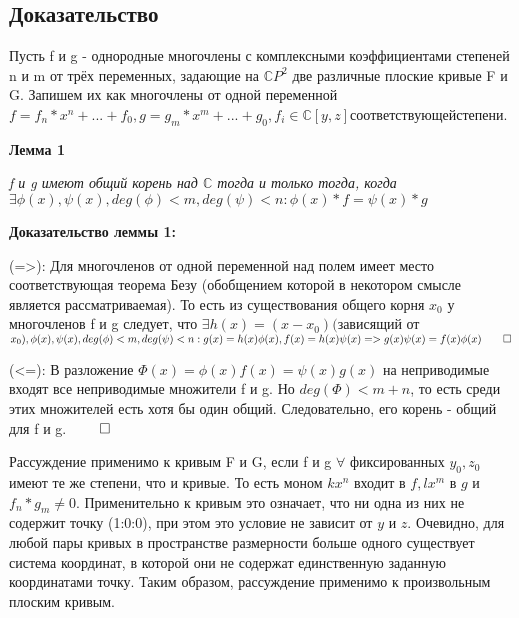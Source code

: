 \documentclass[a4paper, 12pt]{article}
\begin{document}
\subsection{Доказательство}
Пусть f и g - однородные многочлены с комплексными коэффициентами степеней n и m от трёх переменных, задающие на $\mathbb{C}P^2$ две различные плоские кривые F и G.
Запишем их как многочлены от одной переменной $f=f_n*x^n + ... + f_0, g=g_m*x^m + ... + g_0, f_i \in \mathbb{C}[y,z] соответствующей степени$.

\textbf{Лемма 1}

\textit{f и g имеют общий корень над $\mathbb{C}$ тогда и только тогда, когда $\exists \phi(x), \psi(x), deg(\phi) < m, deg(\psi) < n: \phi(x)*f = \psi(x)*g$}

\textbf{Доказательство леммы 1:}

(=>): Для многочленов от одной переменной над полем имеет место соответствующая теорема Безу (обобщением которой в некотором смысле является рассматриваемая). То есть из существования общего корня $x_0$ у многочленов f и g следует, что $\exists h(x)=(x-x_0) ($зависящий от $x_0), \phi(x), \psi(x), deg(\phi) < m, deg(\psi) < n: g(x)=h(x)\phi(x), f(x)=h(x)\psi(x) => g(x)\psi(x) = f(x)\phi(x) \qed$

(<=): В разложение $\Phi(x) = \phi(x)f(x) = \psi(x)g(x)$ на неприводимые входят все неприводимые множители f и g. Но $deg(\Phi) < m + n$, то есть среди этих множителей есть хотя бы один общий. Следовательно, его корень - общий для f и g. $\qed$

Рассуждение применимо к кривым F и G, если f и g $\forall$ фиксированных $y_0, z_0$ имеют те же степени, что и кривые. То есть моном $kx^n$ входит в $f, lx^m$ в $g$ и $f_n*g_m \neq 0$. Применительно к кривым это означает, что ни одна из них не содержит точку (1:0:0), при этом это условие не зависит от $y$ и $z$. Очевидно, для любой пары кривых в пространстве размерности больше одного существует система координат, в которой они не содержат единственную заданную координатами точку. Таким образом, рассуждение применимо к произвольным плоским кривым. %
\end{document}
